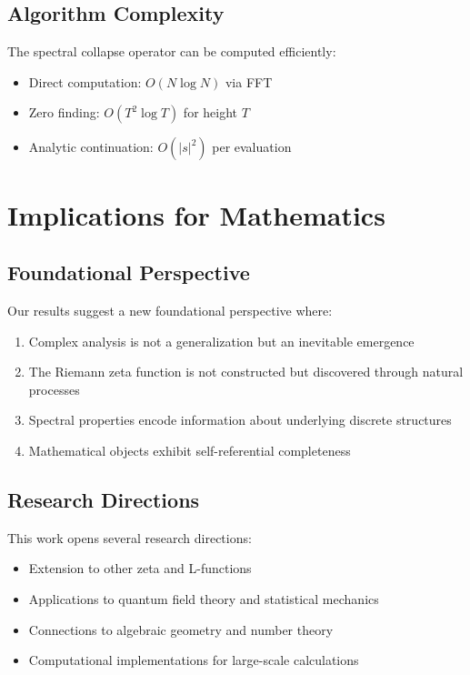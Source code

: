 \documentclass[12pt]{article}
\theoremstyle{plain}
\theoremstyle{definition}
\begin{document}
\subsection{Algorithm Complexity}

The spectral collapse operator can be computed efficiently:
\begin{itemize}
\item Direct computation: $O(N \log N)$ via FFT
\item Zero finding: $O(T^2 \log T)$ for height $T$
\item Analytic continuation: $O(|s|^2)$ per evaluation
\end{itemize}

\section{Implications for Mathematics}

\subsection{Foundational Perspective}

Our results suggest a new foundational perspective where:
\begin{enumerate}
\item Complex analysis is not a generalization but an inevitable emergence
\item The Riemann zeta function is not constructed but discovered through natural processes
\item Spectral properties encode information about underlying discrete structures
\item Mathematical objects exhibit self-referential completeness
\end{enumerate}

\subsection{Research Directions}

This work opens several research directions:
\begin{itemize}
\item Extension to other zeta and L-functions
\item Applications to quantum field theory and statistical mechanics
\item Connections to algebraic geometry and number theory
\item Computational implementations for large-scale calculations
\end{itemize}
\end{document}
